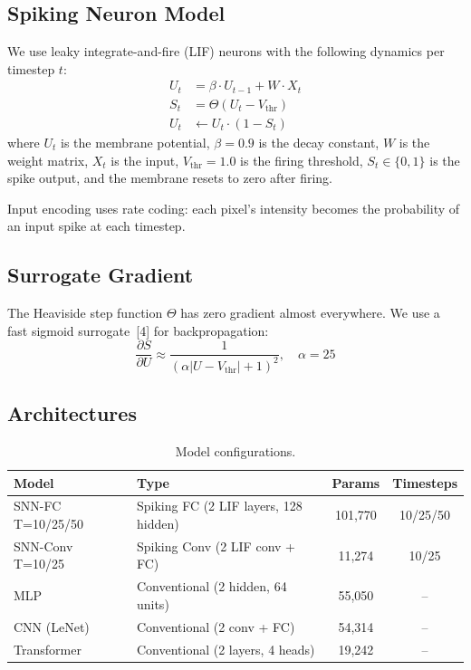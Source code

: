 \documentclass[11pt,a4paper]{article}
\begin{document}
\subsection{Spiking Neuron Model}

We use leaky integrate-and-fire (LIF) neurons with the following dynamics per timestep $t$:
\begin{align}
U_t &= \beta \cdot U_{t-1} + W \cdot X_t \\
S_t &= \Theta(U_t - V_{\text{thr}}) \\
U_t &\leftarrow U_t \cdot (1 - S_t)
\end{align}
where $U_t$ is the membrane potential, $\beta = 0.9$ is the decay constant, $W$ is the weight matrix, $X_t$ is the input, $V_{\text{thr}} = 1.0$ is the firing threshold, $S_t \in \{0, 1\}$ is the spike output, and the membrane resets to zero after firing.

Input encoding uses rate coding: each pixel's intensity becomes the probability of an input spike at each timestep.

\subsection{Surrogate Gradient}

The Heaviside step function $\Theta$ has zero gradient almost everywhere. We use a fast sigmoid surrogate~[4] for backpropagation:
\begin{equation}
\frac{\partial S}{\partial U} \approx \frac{1}{(\alpha |U - V_{\text{thr}}| + 1)^2}, \quad \alpha = 25
\end{equation}

\subsection{Architectures}

\begin{table}[H]
\centering
\caption{Model configurations.}
\begin{tabular}{llcc}
\toprule
\textbf{Model} & \textbf{Type} & \textbf{Params} & \textbf{Timesteps} \\
\midrule
SNN-FC T=10/25/50 & Spiking FC (2 LIF layers, 128 hidden) & 101,770 & 10/25/50 \\
SNN-Conv T=10/25 & Spiking Conv (2 LIF conv + FC) & 11,274 & 10/25 \\
MLP & Conventional (2 hidden, 64 units) & 55,050 & -- \\
CNN (LeNet) & Conventional (2 conv + FC) & 54,314 & -- \\
Transformer & Conventional (2 layers, 4 heads) & 19,242 & -- \\
\bottomrule
\end{tabular}
\end{table}
\end{document}
